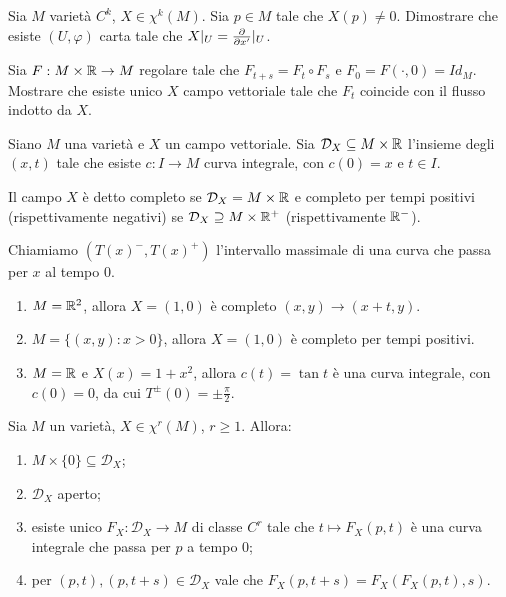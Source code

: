 \begin{exercise}
	Sia $M$ varietà $C^k$, $X\in\chi^k(M)$. Sia $p\in M$ tale che $X(p)\not=0$. Dimostrare che esiste $(U,\varphi)$ carta tale che $X|_ U=\frac{\partial}{\partial x'}|_ U$.
\end{exercise}	

\begin{exercise}
	Sia $F:M\times\mathbb R\to M$ regolare tale che $F_{t+s}=F_t\circ F_s$ e $F_0=F(\cdot,0)=Id_M$. Mostrare che esiste unico $X$ campo vettoriale tale che $F_t$ coincide con il flusso indotto da $X$.
\end{exercise}

\begin{definition}  
	Siano $M$ una varietà e $X$ un campo vettoriale. Sia $\mathcal D_X\subseteq M\times \mathbb R$ l'insieme degli $(x,t)$ tale che esiste $c:I\to M$ curva integrale, con $c(0)=x$ e $t \in I$.
	
	Il campo $X$ è detto completo se $\mathcal D_X=M\times \mathbb R$ e completo per tempi positivi (rispettivamente negativi) se $\mathcal D_X\supseteq M\times\mathbb R^+$ (rispettivamente $\mathbb R^-$).
	
	Chiamiamo $(T(x)^-,T(x)^+)$ l'intervallo massimale di una curva che passa per $x$ al tempo 0. 
\end{definition}

\begin{example}
\begin{enumerate}
	\item $M=\mathbb R^2$, allora $X=(1,0)$ è completo $(x,y)\to (x+t,y)$.
	\item $M=\{(x,y):x>0\}$, allora $X=(1,0)$ è completo per tempi positivi.
	\item $M=\mathbb R$ e $X(x)=1+x^2$, allora $c(t)=\tan t$ è una curva integrale, con $c(0)=0$, da cui $T^\pm(0)=\pm \frac \pi 2$.
\end{enumerate}
\end{example}

\begin{proposition} \label{prop:ProprietaDX}
	Sia $M$ un varietà, $X\in \chi^r(M)$, $r\ge 1$. Allora:
	\begin{enumerate}
	 \item $M\times\{0\}\subseteq \mathcal D_X$; \label{PDX:ContieneM}
	 \item $\mathcal D_X$ aperto; \label{PDX:Aperto}
	 \item esiste unico $F_X:\mathcal D_X\to M$ di classe $C^r$ tale che $t\mapsto F_X(p,t)$ è una curva integrale che passa per $p$ a tempo 0; \label{PDX:FunzioneSuDX}
	 \item per $(p,t),(p,t+s)\in\mathcal D_X$ vale che $F_X(p,t+s)=F_X(F_X(p,t),s)$. \label{PDX:Composizione}
	\end{enumerate}
\end{proposition}

